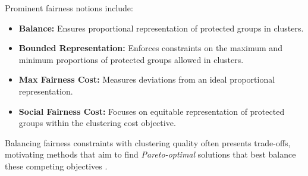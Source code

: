 Prominent fairness notions include:
\begin{itemize}
    \item \textbf{Balance:} Ensures proportional representation of protected groups in clusters.
    \item \textbf{Bounded Representation:} Enforces constraints on the maximum and minimum proportions of protected groups allowed in clusters.
    \item \textbf{Max Fairness Cost:} Measures deviations from an ideal proportional representation.
    \item \textbf{Social Fairness Cost:} Focuses on equitable representation of protected groups within the clustering cost objective.
\end{itemize}

Balancing fairness constraints with clustering quality often presents trade-offs, motivating methods that aim to find \emph{Pareto-optimal} solutions that best balance these competing objectives \cite{ChhabraOverview}.
